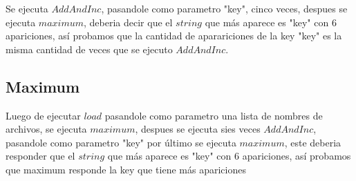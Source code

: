 Se ejecuta $AddAndInc$, pasandole como parametro "key", cinco veces, despues se
ejecuta $maximum$, deberia decir que el $string$ que más aparece es "key" con 6
apariciones, así probamos que la cantidad de aparariciones de la key "key" es
la misma cantidad de veces que se ejecuto $AddAndInc$.

\subsection{Maximum}

Luego de ejecutar $load$ pasandole como parametro una lista de nombres de
archivos, se ejecuta $maximum$, despues se ejecuta sies veces $AddAndInc$,
pasandole como parametro "key" por último se ejecuta $maximum$, este deberia
responder que el $string$ que más aparece es "key" con 6 apariciones, así
probamos que maximum responde la key que tiene más apariciones
